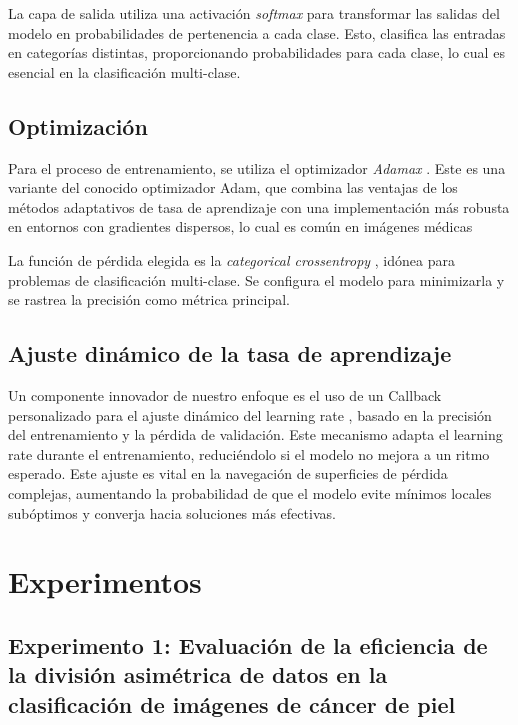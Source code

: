    La capa de salida utiliza una activación \textit{softmax} para transformar las salidas del modelo en probabilidades de pertenencia a cada clase. Esto, clasifica las entradas en categorías distintas, proporcionando probabilidades para cada clase, lo cual es esencial en la clasificación multi-clase.
   
   \subsection{Optimización}
   
   Para el proceso de entrenamiento, se utiliza el optimizador \textit{Adamax} . Este es una variante del conocido optimizador Adam, que combina las ventajas de los métodos adaptativos de tasa de aprendizaje con una implementación más robusta en entornos con gradientes dispersos, lo cual es común en imágenes médicas 
   
   La función de pérdida elegida es la \textit{categorical crossentropy} , idónea para problemas de clasificación multi-clase. Se configura el modelo para minimizarla y se rastrea la precisión como métrica principal.
   
   \subsection{Ajuste dinámico de la tasa de aprendizaje}
   
   Un componente innovador de nuestro enfoque es el uso de un Callback personalizado para el ajuste dinámico del learning rate , basado en la precisión del entrenamiento y la pérdida de validación. Este mecanismo adapta el learning rate durante el entrenamiento, reduciéndolo si el modelo no mejora a un ritmo esperado. Este ajuste es vital en la navegación de superficies de pérdida complejas, aumentando la probabilidad de que el modelo evite mínimos locales subóptimos y converja hacia soluciones más efectivas.

\section{Experimentos}

\subsection{Experimento 1: Evaluación de la eficiencia de la división asimétrica de datos en la clasificación de imágenes de cáncer de piel}

